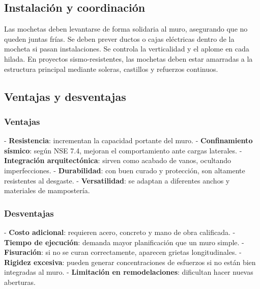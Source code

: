 \documentclass[12pt]{article}
\begin{document}
	\subsection{Instalación y coordinación}
	Las mochetas deben levantarse de forma solidaria al muro, asegurando que no queden juntas frías. Se deben prever ductos o cajas eléctricas dentro de la mocheta si pasan instalaciones. Se controla la verticalidad y el aplome en cada hilada. En proyectos sismo-resistentes, las mochetas deben estar amarradas a la estructura principal mediante soleras, castillos y refuerzos continuos.  
	
	\subsection{Ventajas y desventajas}
	
	\subsubsection{Ventajas}
	- \textbf{Resistencia}: incrementan la capacidad portante del muro.  
	- \textbf{Confinamiento sísmico}: según NSE 7.4, mejoran el comportamiento ante cargas laterales.  
	- \textbf{Integración arquitectónica}: sirven como acabado de vanos, ocultando imperfecciones.  
	- \textbf{Durabilidad}: con buen curado y protección, son altamente resistentes al desgaste.  
	- \textbf{Versatilidad}: se adaptan a diferentes anchos y materiales de mampostería.  
	
	\subsubsection{Desventajas}
	- \textbf{Costo adicional}: requieren acero, concreto y mano de obra calificada.  
	- \textbf{Tiempo de ejecución}: demanda mayor planificación que un muro simple.  
	- \textbf{Fisuración}: si no se curan correctamente, aparecen grietas longitudinales.  
	- \textbf{Rigidez excesiva}: pueden generar concentraciones de esfuerzos si no están bien integradas al muro.  
	- \textbf{Limitación en remodelaciones}: dificultan hacer nuevas aberturas.  
	
	  
	
	
	
	
			
\end{document}
